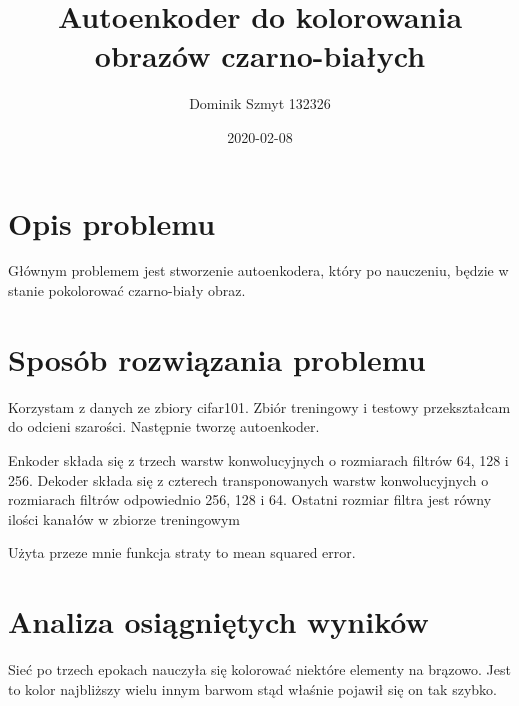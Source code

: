 \documentclass[11pt]{article}
\title{Autoenkoder do kolorowania obrazów czarno-białych}
\author{Dominik Szmyt 132326}
\date{2020-02-08}
\begin{document}
\maketitle
\section{Opis problemu}
Głównym problemem jest stworzenie autoenkodera, który po nauczeniu, będzie w stanie pokolorować czarno-biały obraz.

\section{Sposób rozwiązania problemu}
Korzystam z danych ze zbiory cifar101. Zbiór treningowy i testowy przekształcam do odcieni szarości. Następnie tworzę autoenkoder.

Enkoder składa się z trzech warstw konwolucyjnych o rozmiarach filtrów 64, 128 i 256. Dekoder składa się z czterech transponowanych warstw konwolucyjnych o rozmiarach filtrów odpowiednio 256, 128 i 64. Ostatni rozmiar filtra jest równy ilości kanałów w zbiorze treningowym

Użyta przeze mnie funkcja straty to mean squared error.
\section{Analiza osiągniętych wyników}
Sieć po trzech epokach nauczyła się kolorować niektóre elementy na brązowo. Jest to kolor najbliższy wielu innym barwom stąd właśnie pojawił się on tak szybko.
\end{document}
